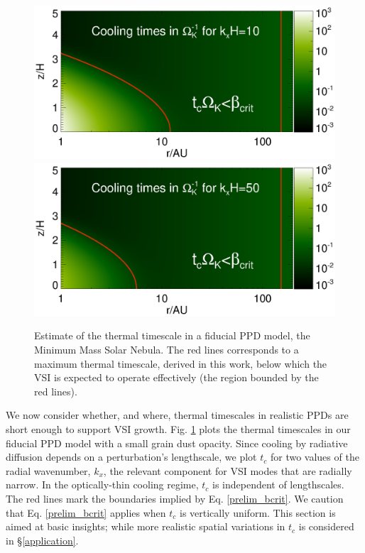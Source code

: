 \documentclass[iop, numberedappendix]{emulateapj}
\begin{document}
\begin{figure}
  \includegraphics[width=\linewidth,clip=true,trim=0cm 1.7cm 0cm
  0.73cm]{figures/bcrit_mmsn2d_kx10}
  \includegraphics[width=\linewidth,clip=true,trim=0cm 0.46cm 0cm
  0.73cm]{figures/bcrit_mmsn2d_kx50}
  \caption{Estimate of the thermal timescale  in a fiducial 
    PPD model, the Minimum Mass Solar Nebula. The red
    lines corresponds to a maximum thermal timescale, derived in
    this work, below which the VSI is expected to operate effectively
    (the region bounded by the red lines).     
    \label{bcrit_mmsn2d} 
  }
\end{figure}

We now consider whether, and where, thermal timescales in realistic PPDs
are short enough to support VSI growth.  Fig. \ref{bcrit_mmsn2d} plots the
thermal timescales in our fiducial PPD model with a small grain dust opacity. 
Since cooling by radiative diffusion depends on a perturbation's lengthscale, we
plot $t_c$ for two values of the radial wavenumber,  $k_x$,  the relevant 
component for VSI modes that are radially narrow. In the
optically-thin cooling regime, $t_c$ is independent of lengthscales. 
The red lines mark the boundaries implied by
Eq. \ref{prelim_bcrit}.  We caution that 
Eq. \ref{prelim_bcrit} applies when $t_c$ is vertically uniform.  This section is 
aimed at basic insights; while more realistic spatial variations in
$t_c$ is considered in \S\ref{application}. 
\end{document}
